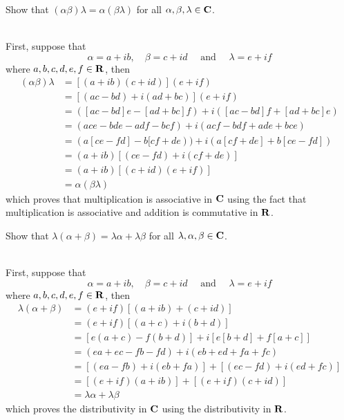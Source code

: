 \begin{exercise}
    Show that $(\alpha\beta)\lambda = \alpha (\beta \lambda)$ for all $\alpha, \beta, \lambda \in \mathbf{C}$. \\
\end{exercise}

\begin{solution}
    \\ First, suppose that
    $$\alpha = a+ ib, \quad \beta = c + id \quad \text{ and } \quad \lambda = e + if$$
    where $a,b,c,d,e,f \in \mathbf{R}$, then
    \begin{align*}
        (\alpha \beta)\lambda &= [(a + ib)(c + id)](e + if) \\
        &= [(ac - bd) +  i(ad + bc)] (e + if) \\
        &= ([ac - bd]e - [ad + bc]f) + i ([ac - bd]f + [ad + bc]e) \\
        &= (ace - bde - adf - bcf) + i(acf - bdf + ade + bce) \\
        &= (a[ce - fd] - b [cf + de)) + i (a[cf + de] + b[ce - fd]) \\
        &= (a + ib) [(ce - fd) + i(cf + de)] \\
        &= (a + ib) [(c + id) (e + if)] \\
        &= \alpha (\beta \lambda)
    \end{align*}
    which proves that multiplication is associative in $\mathbf{C}$ using the fact that multiplication is associative and addition is commutative in $\mathbf{R}$. \\
\end{solution}

\begin{exercise}
    Show that $\lambda(\alpha + \beta) = \lambda \alpha + \lambda \beta$ for all $\lambda, \alpha, \beta \in \mathbf{C}$. \\
\end{exercise}

\begin{solution}
    \\ First, suppose that
    $$\alpha = a+ ib, \quad \beta = c + id \quad \text{ and } \quad \lambda = e + if$$
    where $a,b,c,d,e,f \in \mathbf{R}$, then
    \begin{align*}
        \lambda(\alpha + \beta) &= (e + if)[(a+ib) + (c + id)] \\
        &= (e + if)[(a+c) + i(b+d)] \\
        &= [e(a+c) - f(b+d)] + i[e[b+d] + f[a+c]] \\
        &= (ea + ec - fb - fd) + i(eb + ed + fa + fc) \\
        &= [(ea - fb) + i (eb + fa)] + [(ec - fd) + i(ed + fc)] \\
        &= [(e + if)(a + ib)] + [(e + if)(c + id)] \\
        &= \lambda\alpha + \lambda\beta
    \end{align*}
    which proves the distributivity in $\mathbf{C}$ using the distributivity in $\mathbf{R}$.\\
\end{solution}

